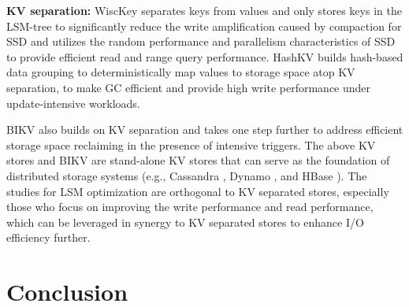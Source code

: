 \documentclass[sigconf]{acmart}
\begin{document}
\textbf{KV separation:} WiscKey \cite{Wisckey} separates keys from values and only stores keys in the LSM-tree to significantly reduce the write amplification caused by compaction for SSD and utilizes the random performance and parallelism characteristics of SSD to provide efficient read and range query performance. HashKV \cite{HashKV} builds hash-based data grouping to deterministically map values to storage space atop KV separation, to make GC efficient and provide high write performance under update-intensive workloads. {}

BIKV also builds on KV separation and takes one step further to address efficient storage space reclaiming in the presence of intensive triggers. {} The above KV stores and BIKV are stand-alone KV stores that can serve as the foundation of distributed storage systems (e.g., Cassandra \cite{ Cassandra}, Dynamo \cite{ Dynamo}, and HBase \cite{HBase}). The studies for LSM optimization are orthogonal to KV separated stores, especially those who focus on improving the write performance and read performance, which can be leveraged in synergy to KV separated stores to enhance I/O efficiency further.

\section{Conclusion} \label{conclusion}
\end{document}
